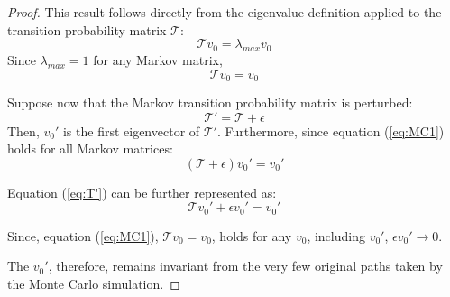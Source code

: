 \documentclass[10pt,a4paper]{amsart}
\begin{document}
\begin{proof}
This result follows directly from the eigenvalue definition applied to the transition probability matrix $\mathcal{T}$:
\begin{equation}
    \mathcal{T}v_0 = \lambda_{max} v_0
\end{equation}
Since $\lambda_{max} = 1$ for any Markov matrix, 
\begin{equation}\label{eq:MC1}
    \mathcal{T}v_0 = v_0
\end{equation}

Suppose now that the Markov transition probability matrix is perturbed:
\begin{equation}
    \mathcal{T'} = \mathcal{T} + \epsilon
\end{equation}
Then, $v_0'$ is the first eigenvector of $\mathcal{T'}$. Furthermore, since equation (\ref{eq:MC1}) holds for all Markov matrices:
\begin{equation}\label{eq:T'}
    (\mathcal{T}+\epsilon)v_0' = v_0'
\end{equation}

Equation (\ref{eq:T'}) can be further represented as:
\begin{equation}
    \mathcal{T}v_0'+\epsilon v_0' = v_0'
\end{equation}

Since, equation (\ref{eq:MC1}),  $\mathcal{T}v_0=v_0$, holds for any $v_0$, including $v_0'$, $\epsilon v_0'\to 0$.

The $v_0'$, therefore, remains invariant from the very few original paths taken by the Monte Carlo simulation.     
\end{proof}
\end{document}
